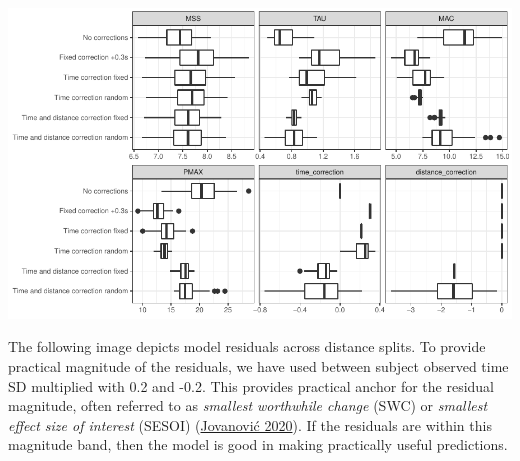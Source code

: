 \documentclass[fleqn,10pt,lineno]{wlpeerj} %
\newenvironment{Shaded}{\begin{snugshade}}{\end{snugshade}}
\newcommand{\AttributeTok}[1]{\textcolor[rgb]{0.77,0.63,0.00}{#1}}
\newcommand{\ConstantTok}[1]{\textcolor[rgb]{0.00,0.00,0.00}{#1}}
\newcommand{\DecValTok}[1]{\textcolor[rgb]{0.00,0.00,0.81}{#1}}
\newcommand{\FunctionTok}[1]{\textcolor[rgb]{0.00,0.00,0.00}{#1}}
\newcommand{\NormalTok}[1]{#1}
\newcommand{\OtherTok}[1]{\textcolor[rgb]{0.56,0.35,0.01}{#1}}
\newcommand{\SpecialCharTok}[1]{\textcolor[rgb]{0.00,0.00,0.00}{#1}}
\newcommand{\StringTok}[1]{\textcolor[rgb]{0.31,0.60,0.02}{#1}}
\begin{document}
\begin{Shaded}
\end{Shaded}

\begin{center}\includegraphics[width=1\linewidth]{paper_files/figure-latex/unnamed-chunk-64-1} \end{center}

The following image depicts model residuals across distance splits. To provide practical magnitude of the residuals, we have used between subject observed time SD multiplied with 0.2 and -0.2. This provides practical anchor for the residual magnitude, often referred to as \emph{smallest worthwhile change} (SWC) or \emph{smallest effect size of interest} (SESOI) (\protect\hyperlink{ref-jovanovicBmbstatsBootstrapMagnitudebased2020}{Jovanović 2020}). If the residuals are within this magnitude band, then the model is good in making practically useful predictions.
\end{document}
